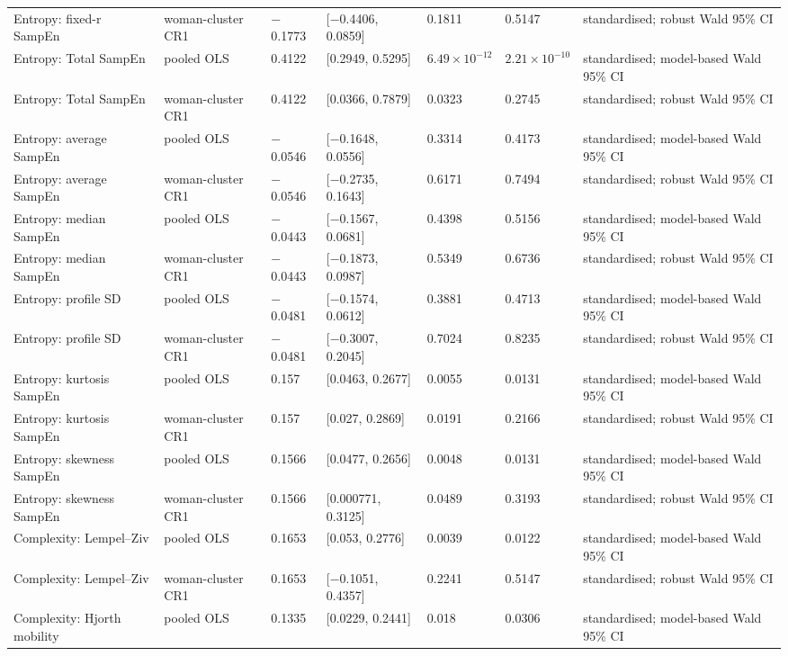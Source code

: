 \documentclass[10pt]{article}
\begin{document}
\begin{landscape}
\begin{longtable}{p{4.0cm}p{3.4cm}p{2.0cm}p{3.4cm}p{1.9cm}p{1.9cm}p{5.2cm}}
Entropy: fixed-r SampEn & woman-cluster CR1 & $-$0.1773 & [$-$0.4406, 0.0859] & 0.1811 & 0.5147 & standardised; robust Wald 95\% CI \\
Entropy: Total SampEn & pooled OLS & 0.4122 & [0.2949, 0.5295] & $6.49\times10^{-12}$ & $2.21\times10^{-10}$ & standardised; model-based Wald 95\% CI \\
Entropy: Total SampEn & woman-cluster CR1 & 0.4122 & [0.0366, 0.7879] & 0.0323 & 0.2745 & standardised; robust Wald 95\% CI \\
Entropy: average SampEn & pooled OLS & $-$0.0546 & [$-$0.1648, 0.0556] & 0.3314 & 0.4173 & standardised; model-based Wald 95\% CI \\
Entropy: average SampEn & woman-cluster CR1 & $-$0.0546 & [$-$0.2735, 0.1643] & 0.6171 & 0.7494 & standardised; robust Wald 95\% CI \\
Entropy: median SampEn & pooled OLS & $-$0.0443 & [$-$0.1567, 0.0681] & 0.4398 & 0.5156 & standardised; model-based Wald 95\% CI \\
Entropy: median SampEn & woman-cluster CR1 & $-$0.0443 & [$-$0.1873, 0.0987] & 0.5349 & 0.6736 & standardised; robust Wald 95\% CI \\
Entropy: profile SD & pooled OLS & $-$0.0481 & [$-$0.1574, 0.0612] & 0.3881 & 0.4713 & standardised; model-based Wald 95\% CI \\
Entropy: profile SD & woman-cluster CR1 & $-$0.0481 & [$-$0.3007, 0.2045] & 0.7024 & 0.8235 & standardised; robust Wald 95\% CI \\
Entropy: kurtosis SampEn & pooled OLS & 0.157 & [0.0463, 0.2677] & 0.0055 & 0.0131 & standardised; model-based Wald 95\% CI \\
Entropy: kurtosis SampEn & woman-cluster CR1 & 0.157 & [0.027, 0.2869] & 0.0191 & 0.2166 & standardised; robust Wald 95\% CI \\
Entropy: skewness SampEn & pooled OLS & 0.1566 & [0.0477, 0.2656] & 0.0048 & 0.0131 & standardised; model-based Wald 95\% CI \\
Entropy: skewness SampEn & woman-cluster CR1 & 0.1566 & [0.000771, 0.3125] & 0.0489 & 0.3193 & standardised; robust Wald 95\% CI \\
Complexity: Lempel--Ziv & pooled OLS & 0.1653 & [0.053, 0.2776] & 0.0039 & 0.0122 & standardised; model-based Wald 95\% CI \\
Complexity: Lempel--Ziv & woman-cluster CR1 & 0.1653 & [$-$0.1051, 0.4357] & 0.2241 & 0.5147 & standardised; robust Wald 95\% CI \\
Complexity: Hjorth mobility & pooled OLS & 0.1335 & [0.0229, 0.2441] & 0.018 & 0.0306 & standardised; model-based Wald 95\% CI \\

\end{longtable}
\end{landscape}
\end{document}
